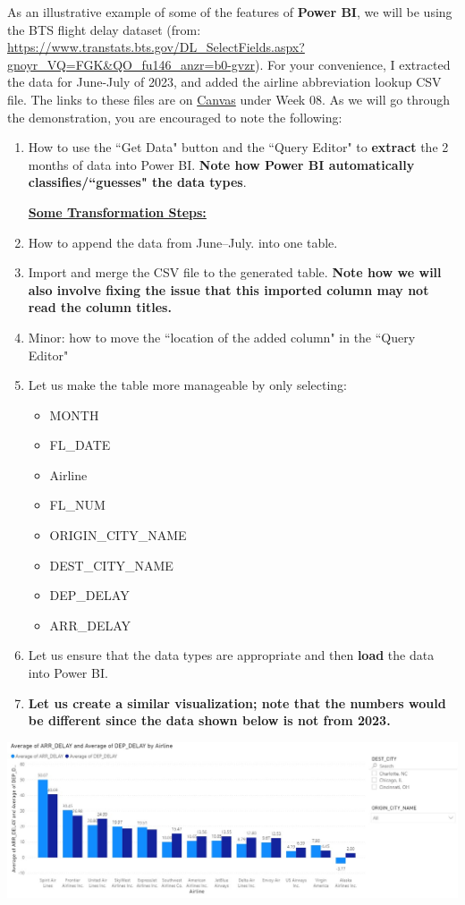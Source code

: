 \documentclass[letterpaper,addpoints, 11pt]{exam}
\begin{document}
\begin{questions}

\question[0] As an illustrative example of some of the features of \textbf{Power BI}, we will be using the BTS flight delay dataset (from: \url{https://www.transtats.bts.gov/DL_SelectFields.aspx?gnoyr_VQ=FGK&QO_fu146_anzr=b0-gvzr}). For your convenience, I extracted the data for June-July of 2023, and  added the airline abbreviation lookup CSV file. The links to these files are on \underline{Canvas} under Week 08. As we will go through the demonstration, you are encouraged to note the following: 
\begin{enumerate}[label=(\Alph*)]
	\item How to use the ``Get Data" button and the ``Query Editor" to \textbf{extract} the 2 months of data into Power BI. \textbf{Note how Power BI automatically classifies/``guesses" the data types}.\\
	\bigskip \bigskip \bigskip \bigskip
	
	\noindent \underline{\textbf{Some Transformation Steps:}}
	\item How to append the data from June--July. into one table.
	\bigskip \bigskip \bigskip  
	\item Import and merge the CSV file to the generated table. \textbf{Note how we will also involve fixing the issue that this imported column may not read the column titles.}
	\bigskip \bigskip
	\item Minor: how to move the ``location of the added column" in the ``Query Editor"
	\bigskip
	\item Let us make the table more manageable by only selecting: 
	\begin{itemize}[nosep]
		\item MONTH
		\item FL\_DATE
		\item Airline
		\item FL\_NUM
		\item ORIGIN\_CITY\_NAME
		\item DEST\_CITY\_NAME
		\item DEP\_DELAY 
		\item ARR\_DELAY
	\end{itemize}
	\item Let us ensure that the data types are appropriate and then \textbf{load} the data into Power BI.
	\bigskip \bigskip
	\item \textbf{Let us create a similar visualization; note that the numbers would be different since the data shown below is not from 2023.}	
\end{enumerate}
 	
{\centering \includegraphics[width=\textwidth,frame]{../../figures/powerbi}}

\vspace{0.25in}



\end{questions}
\end{document}
